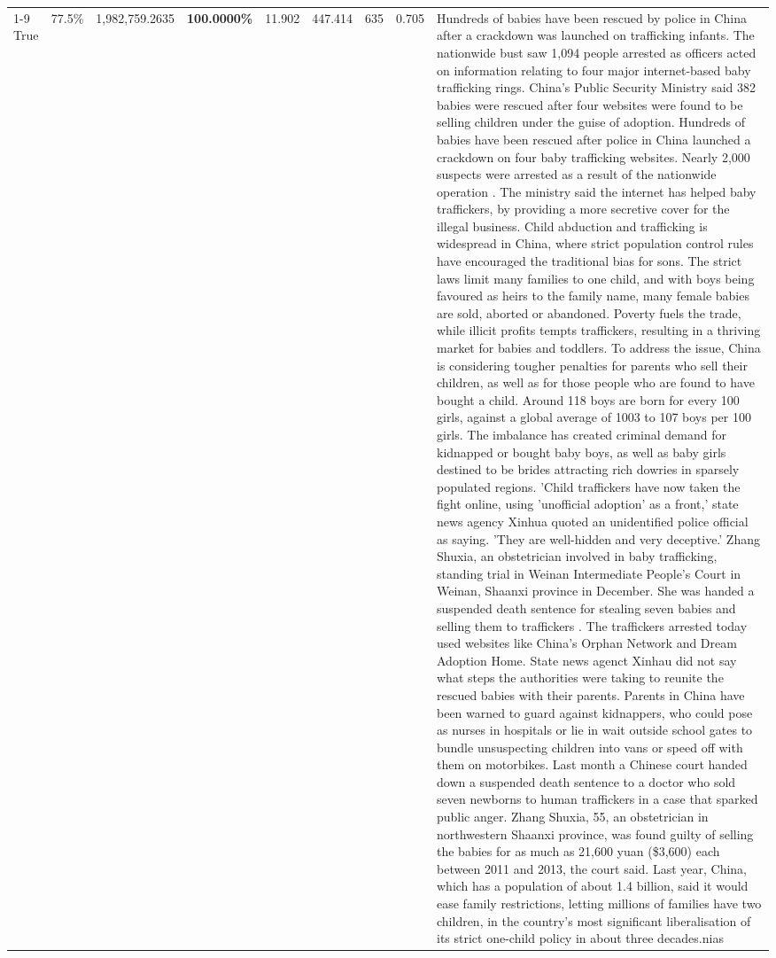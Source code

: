 \begin{table}[H]
\begin{tabular}{lllrlllll}
\cline{1-9}
True & 77.5\% & 1,982,759.2635 & \bfseries \color{red} 100.0000\% & 11.902 & 447.414 & 635 & 0.705 & Hundreds of babies have been rescued by police in China after a crackdown was launched on trafficking infants. The nationwide bust saw 1,094 people arrested as officers acted on information relating to four major internet-based baby trafficking rings. China's Public Security Ministry said 382 babies were rescued after four websites were found to be selling children under the guise of adoption. Hundreds of babies have been rescued after police in China launched a crackdown on four baby trafficking websites. Nearly 2,000 suspects were arrested as a result of the nationwide operation . The ministry said the internet has helped baby traffickers, by providing a more secretive cover for the illegal business. Child abduction and trafficking is widespread in China, where strict population control rules have encouraged the traditional bias for sons. The strict laws limit many families to one child, and with boys being favoured as heirs to the family name, many female babies are sold, aborted or abandoned. Poverty fuels the trade, while illicit profits tempts traffickers, resulting in a thriving market for babies and toddlers. To address the issue, China is considering tougher penalties for parents who sell their children, as well as for those people who are found to have bought a child. Around 118 boys are born for every 100 girls, against a global average of 1003 to 107 boys per 100 girls. The imbalance has created criminal demand for kidnapped or bought baby boys, as well as baby girls destined to be brides attracting rich dowries in sparsely populated regions. 'Child traffickers have now taken the fight online, using 'unofficial adoption' as a front,' state news agency Xinhua quoted an unidentified police official as saying. 'They are well-hidden and very deceptive.' Zhang Shuxia, an obstetrician involved in baby trafficking, standing trial in Weinan Intermediate People's Court in Weinan, Shaanxi province in December. She was handed a suspended death sentence for stealing seven babies and selling them to traffickers . The traffickers arrested today used websites like China's Orphan Network and Dream Adoption Home. State news agenct Xinhau did not say what steps the authorities were taking to reunite the rescued babies with their parents. Parents in China have been warned to guard against kidnappers, who could pose as nurses in hospitals or lie in wait outside school gates to bundle unsuspecting children into vans or speed off with them on motorbikes. Last month a Chinese court handed down a suspended death sentence to a doctor who sold seven newborns to human traffickers in a case that sparked public anger. Zhang Shuxia, 55, an obstetrician in northwestern Shaanxi province, was found guilty of selling the babies for as much as 21,600 yuan (\$3,600) each between 2011 and 2013, the court said. Last year, China, which has a population of about 1.4 billion, said it would ease family restrictions, letting millions of families have two children, in the country's most significant liberalisation of its strict one-child policy in about three decades.nias \\

\end{tabular}
\end{table}
